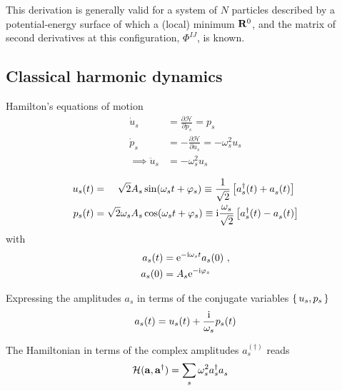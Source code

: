 This derivation is generally valid for a system of $N$ particles described by a potential-energy surface of which a (local) minimum ${\bf R}^0$, and the matrix of second derivatives at this configuration, $\Phi^{IJ}$, is known.

\subsection{Classical harmonic dynamics}

Hamilton's equations of motion
\begin{align}
	\dot{u}_s
		& = \frac{\partial \mathcal H}{\partial p_s}
			= p_s \\
	\dot{p}_s
		& = - \frac{\partial \mathcal H}{\partial u_s}
			= - \omega^2_s u_s \\
	\implies
	\ddot{u}_s 
		& = - \omega^2_s u_s
\end{align}

\begin{align}
	u_s (t) 
		&= \phantom{\omega_s} \sqrt 2 A_s \sin (\omega_s t + \varphi_s)
		\equiv \frac{1}{\sqrt{2}} \left[ \D a_s (t) + \fD a_s (t) \right] \\
	p_s (t) 
		&= \sqrt 2 \omega_s A_s \cos (\omega_s t + \varphi_s)
		\equiv \im \frac{\omega_s}{\sqrt{2}} \left[ \D a_s (t) - \fD a_s (t) \right]
\end{align}
with
\begin{align}
	a_s (t) 
		& = {\rm e}^{- {\rm i} \omega_s t} a_s (0)~, \\
	a_s (0)
		& = A_s {\rm e}^{- {\rm i} \varphi_s}
\end{align}

Expressing the amplitudes $a_s$ in terms of the conjugate variables $\set{u_s, p_s}$
\begin{align}
    a_s (t) = u_s (t) + \frac{{\rm i}}{\omega_s} p_s (t)
\end{align}

The Hamiltonian in terms of the complex amplitudes $a^{(\dagger)}_s$ reads
\begin{align}
	\mathcal{H}(\b a, \D{\b a})
		&= \sum_s \omega^2_s \D a_s\fD  a_s
\end{align}

